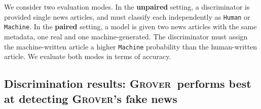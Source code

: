 \documentclass{article}
\newcommand{\modelname}{{\textsc{Grover}}}
\begin{document}
We consider two evaluation modes. In the \textbf{unpaired} setting, a discriminator is provided single news articles, and must classify each independently as {\tt\small Human} or {\tt\small Machine}. In the \textbf{paired} setting, a model is given two news articles with the same metadata, one real and one machine-generated. The discriminator must assign the machine-written article a higher {\tt\small Machine} probability than the human-written article. We evaluate both modes in terms of accuracy.


\subsection{Discrimination results: \modelname~performs best at detecting \modelname's fake news}

\newcommand{\best}[1]{\textbf{#1}}
\newcommand{\scnd}[1]{#1}
\newcommand{\resultswidth}{1.35cm}
\end{document}
